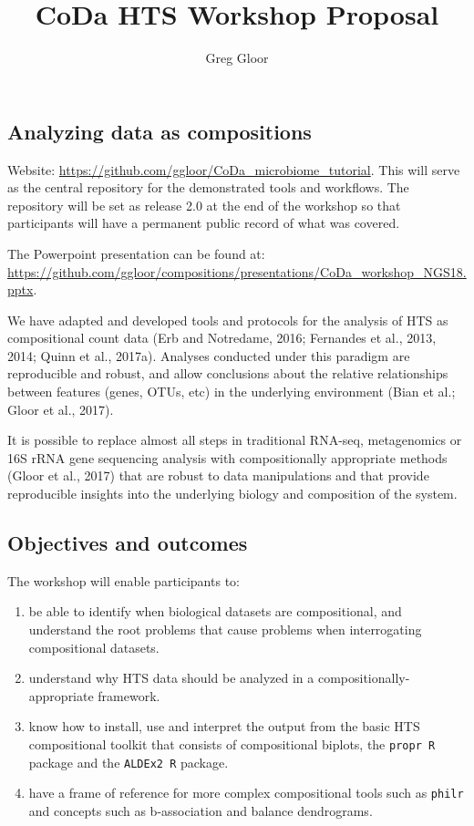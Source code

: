 \documentclass[twocolumn]{article}
\title{CoDa HTS Workshop Proposal}
\author{Greg Gloor}
\date{}
\begin{document}
\maketitle

{
\setcounter{tocdepth}{3}
\tableofcontents
}
\hypertarget{analyzing-data-as-compositions}{%
\subsection{Analyzing data as
compositions}\label{analyzing-data-as-compositions}}

Website: \url{https://github.com/ggloor/CoDa_microbiome_tutorial}. This
will serve as the central repository for the demonstrated tools and
workflows. The repository will be set as release 2.0 at the end of the
workshop so that participants will have a permanent public record of
what was covered.

The Powerpoint presentation can be found at:
\url{https://github.com/ggloor/compositions/presentations/CoDa_workshop_NGS18.pptx}.

We have adapted and developed tools and protocols for the analysis of
HTS as compositional count data (Erb and Notredame, 2016; Fernandes et
al., 2013, 2014; Quinn et al., 2017a). Analyses conducted under this
paradigm are reproducible and robust, and allow conclusions about the
relative relationships between features (genes, OTUs, etc) in the
underlying environment (Bian et al.; Gloor et al., 2017).

It is possible to replace almost all steps in traditional RNA-seq,
metagenomics or 16S rRNA gene sequencing analysis with compositionally
appropriate methods (Gloor et al., 2017) that are robust to data
manipulations and that provide reproducible insights into the underlying
biology and composition of the system.

\hypertarget{objectives-and-outcomes}{%
\subsection{Objectives and outcomes}\label{objectives-and-outcomes}}

The workshop will enable participants to:

\begin{enumerate}
\def\labelenumi{\arabic{enumi}.}
\item
  be able to identify when biological datasets are compositional, and
  understand the root problems that cause problems when interrogating
  compositional datasets.
\item
  understand why HTS data should be analyzed in a
  compositionally-appropriate framework.
\item
  know how to install, use and interpret the output from the basic HTS
  compositional toolkit that consists of compositional biplots, the
  \texttt{propr\ R} package and the \texttt{ALDEx2\ R} package.
\item
  have a frame of reference for more complex compositional tools such as
  \texttt{philr} and concepts such as b-association and balance
  dendrograms.
\end{enumerate}
\end{document}
